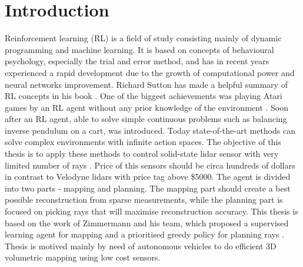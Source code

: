 \section{Introduction}

Reinforcement learning (RL) is a field of study consisting mainly of dynamic programming and machine learning. It is based on concepts of behavioural psychology, especially the trial and error method, and has in recent years experienced a rapid development due to the growth of computational power and neural networks improvement. Richard Sutton has made a helpful summary of RL concepts in his book \cite{sutton2012}. One of the biggest achievements was playing Atari games by an RL agent without any prior knowledge of the environment \cite{mnih2015}. Soon after an RL agent, able to solve simple continuous problems such as balancing inverse pendulum on a cart, was introduced. Today state-of-the-art methods can solve complex environments with infinite action spaces. The objective of this thesis is to apply these methods to control solid-state lidar sensor with very limited number of rays \cite{quanergy2016}. Price of this sensors should be circa hundreds of dollars in contrast to Velodyne lidars with price tag above \$5000. The agent is divided into two parts - mapping and planning. The mapping part should create a best possible reconstruction from sparse measurements, while the planning part is focused on picking rays that will maximise reconstruction accuracy. This thesis is based on the work of Zimmermann and his team, which proposed a supervised learning agent for mapping and a prioritised greedy policy for planning rays \cite{zimmermann2017}. Thesis is motived mainly by need of autonomous vehicles to do efficient 3D volumetric mapping using low cost sensors. 